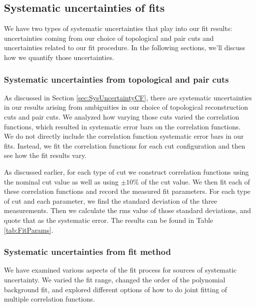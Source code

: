 \subsection{Systematic uncertainties of fits}
\label{sec:SysErrorsFits}

We have two types of systematic uncertainties that play into our fit results: uncertainties coming from our choice of topological and pair cuts and uncertainties related to our fit procedure.
In the following sections, we'll discuss how we quantify those uncertainties.


\subsubsection{Systematic uncertainties from topological and pair cuts}
\label{sec:SysErrorsFitsCuts}

As discussed in Section \ref{sec:SysUncertaintyCF}, there are systematic uncertainties in our results arising from ambiguities in our choice of topological reconstruction cuts and pair cuts.
We analyzed how varying those cuts varied the correlation functions, which resulted in systematic error bars on the correlation functions.
We do not directly include the correlation function systematic error bars in our fits.
Instead, we fit the correlation functions for each cut configuration and then see how the fit results vary.

As discussed earlier, for each type of cut we construct correlation functions using the nominal cut value as well as using $\pm10\%$ of the cut value.
We then fit each of these correlation functions and record the measured fit parameters.
For each type of cut and each parameter, we find the standard deviation of the three measurements.
Then we calculate the rms value of those standard deviations, and quote that as the systematic error.
The results can be found in Table \ref{tab:FitParams}.



\subsubsection{Systematic uncertainties from fit method}
\label{sec:SysErrorsFitsMethod}



We have examined various aspects of the fit process for sources of systematic uncertainty.
We varied the fit range, changed the order of the polynomial background fit, and explored different options of how to do joint fitting of multiple correlation functions.


